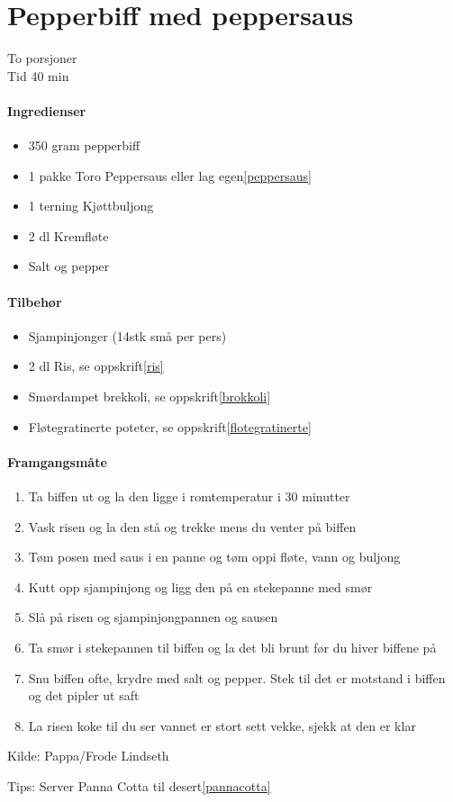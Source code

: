\section{﻿Pepperbiff med peppersaus}
To porsjoner\\
Tid 40 min

\paragraph{Ingredienser}
\begin{itemize}[noitemsep]
	\item 350 gram  pepperbiff
	\item 1 pakke Toro Peppersaus eller lag egen\ref{peppersaus}
	\item 1 terning Kjøttbuljong
	\item 2 dl Kremfløte
	\item Salt og pepper
\end{itemize}

\paragraph{Tilbehør}
\begin{itemize}[noitemsep]
	\item Sjampinjonger (14stk små per pers)
	\item 2 dl Ris, se oppskrift\ref{ris}
	\item Smørdampet brekkoli, se oppskrift\ref{brokkoli}
	\item Fløtegratinerte poteter, se oppskrift\ref{flotegratinerte}
\end{itemize}

\paragraph{Framgangsmåte}
\begin{enumerate}[noitemsep]
	\item Ta biffen ut og la den ligge i romtemperatur i 30 minutter
	\item Vask risen og la den stå og trekke mens du venter på biffen
	\item Tøm posen med saus i en panne og tøm oppi fløte, vann og buljong
	\item Kutt opp sjampinjong og ligg den på en stekepanne med smør
	\item Slå på risen og sjampinjongpannen og sausen
	\item Ta smør i stekepannen til biffen og la det bli brunt før du hiver biffene på
	\item Snu biffen ofte, krydre med salt og pepper. Stek til det er motstand i biffen og det pipler ut saft
	\item La risen koke til du ser vannet er stort sett vekke, sjekk at den er klar
\end{enumerate}

Kilde: Pappa/Frode Lindseth

Tips: Server Panna Cotta til desert\ref{pannacotta}
